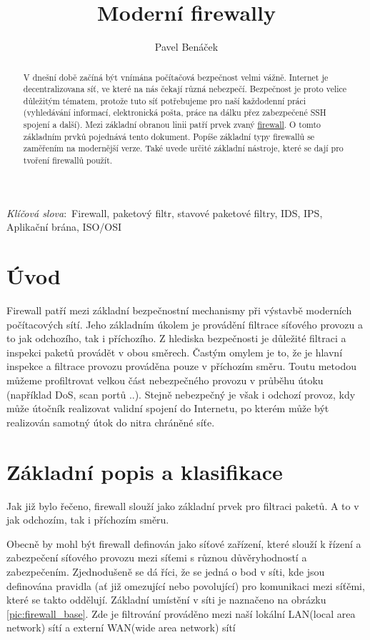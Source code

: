 \documentclass[11pt,twoside,a4paper]{article}
\title{Moderní firewally}
\author{Pavel Benáček}
\def\keywords{\vspace{.5em}
{\textit{Klíčová slova}:\,\relax%
}}
\begin{document}
\maketitle

\begin{abstract}

V dnešní době začíná být vnímána počítačová bezpečnost velmi vážně. Internet je decentralizovana síť, ve které na nás čekají různá nebezpečí. Bezpečnost je proto velice důležitým tématem, protože tuto síť potřebujeme pro naší každodenní práci (vyhledávání informací, elektronická pošta, práce na dálku přez zabezpečené SSH spojení a další). Mezi základní obranou linii patří prvek zvaný \underline{firewall}. O tomto základním prvků pojednává tento dokument. Popíše základní typy firewallů se zaměřením na modernější verze. Také uvede určité základní nástroje, které se dají pro tvoření firewallů použít.
\end{abstract}

\keywords{Firewall, paketový filtr, stavové paketové filtry, IDS, IPS, Aplikační brána, ISO/OSI}

\tableofcontents

\section{Úvod}

Firewall patří mezi základní bezpečnostní mechanismy při výstavbě moderních počítacových sítí. Jeho základním úkolem je provádění filtrace síťového provozu a to jak odchozího, tak i příchozího. Z hlediska bezpečnosti je důležité filtraci a inspekci paketů provádět v obou směrech. Častým omylem je to, že je hlavní inspekce a filtrace provozu prováděna pouze v příchozím směru. Toutu metodou můžeme profiltrovat velkou část nebezpečného provozu v průběhu útoku (například DoS, scan portů ..). Stejně nebezpečný je však i odchozí provoz, kdy může útočník realizovat validní spojení do Internetu, po kterém může být realizován samotný útok do nitra chráněné síťe.
 
\section{Základní popis a klasifikace}\label{sec:defend} 

Jak již bylo řečeno, firewall slouží jako základní prvek pro filtraci paketů. A to v jak odchozím, tak i příchozím směru.

Obecně by mohl být firewall definován jako síťové zařízení, které slouží k řízení a zabezpečení síťového provozu mezi síťemi s různou důvěryhodností a zabezpečením. Zjednodušeně se dá říci, že se jedná o bod v síti, kde jsou definována pravidla (ať již omezující nebo povolující) pro komunikaci mezi síťěmi, které se takto oddělují. Základní umístění v síti je naznačeno na obrázku \ref{pic:firewall_base}. Zde je filtrování prováděno mezi naší lokální LAN(local area network) sítí a externí WAN(wide area network) sítí
\end{document}
